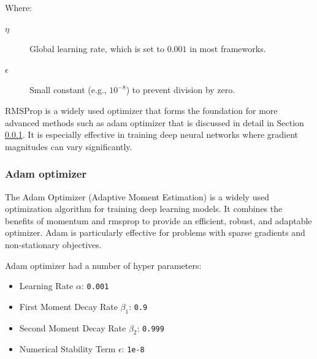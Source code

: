 				
		Where:
		\begin{description}
			\item[$\eta$] Global learning rate, which is set to $0.001$ in most frameworks.
			\item[$\epsilon$] Small constant (e.g., $10^{-8}$) to prevent division by zero.
		\end{description}
		\bigskip

		
		RMSProp is a widely used optimizer that forms the foundation for more advanced methods such as adam optimizer that is discussed in detail in Section \ref{section:adam}. It is especially effective in training deep neural networks where gradient magnitudes can vary significantly.

	
		\bigskip
		\subsubsection{Adam optimizer}
		\label{section:adam}
		
		The Adam Optimizer (Adaptive Moment Estimation) is a widely used optimization algorithm for training deep learning models. It combines the benefits of momentum and rmsprop to provide an efficient, robust, and adaptable optimizer. Adam is particularly effective for problems with sparse gradients and non-stationary objectives.
		
		
		Adam optimizer had a number of hyper parameters:
		
		\begin{itemize}
			\item Learning Rate $\alpha$: \texttt{0.001}
			\item First Moment Decay Rate $\beta_1$: \texttt{0.9}
			\item Second Moment Decay Rate $\beta_2$: \texttt{0.999}
			\item Numerical Stability Term $\epsilon$: \texttt{1e-8}
		\end{itemize}
		\bigskip

